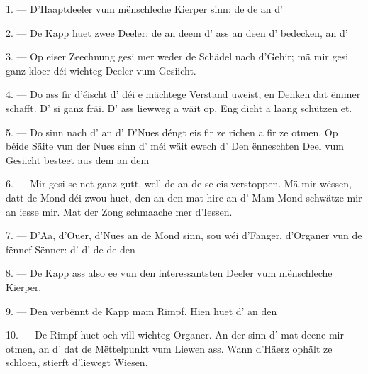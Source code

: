 1. --- D'Haaptdeeler vum mënschleche Kierper sinn: de  de
 an d'

\VUsaut{3.0mm}

2. --- De Kapp huet zwee Deeler: de  an deem d' ass an
deen d' bedecken, an d'

3. --- Op eiser Zeechnung gesi mer weder de Schädel nach d'Gehir; mä mir gesi ganz
kloer déi wichteg Deeler vum Gesiicht.

4. --- Do ass fir d'éischt d' déi e mächtege Verstand uweist, en Denken
dat ëmmer schafft. D' si ganz fräi. D' ass liewweg a
wäit op. Eng dicht  a laang  schützen et.

5. --- Do sinn nach d' an d' D'Nues déngt eis fir ze
richen a fir ze otmen. Op béide Säite vun der Nues sinn d' méi wäit
ewech d' Den ënneschten Deel vum Gesiicht besteet aus dem
 an dem 

6. --- Mir gesi se net ganz gutt, well de  an de
 se eis verstoppen. Mä mir wëssen, datt de Mond déi zwou
 huet, den  an den  mat hire
 an d' Mam Mond schwätze mir an iesse mir. Mat der Zong
schmaache mer d'Iessen.

7. --- D'Aa, d'Ouer, d'Nues an de Mond sinn, sou wéi d'Fanger, d'Organer vun de
fënnef Sënner: d' d' de  de
 den 

8. --- De Kapp ass also ee vun den interessantsten Deeler vum mënschleche Kierper.

\VUsaut{4.4mm}
\VUsaut{3.0mm}

9. --- Den  verbënnt de Kapp mam Rimpf. Hien huet d' an den

10. --- De Rimpf huet och vill wichteg Organer. An der  sinn
d' mat deene mir otmen, an d' dat de Mëttelpunkt vum
Liewen ass. Wann d'Häerz ophält ze schloen, stierft d'liewegt Wiesen.

